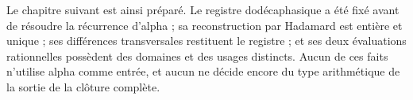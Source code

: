 Le chapitre suivant est ainsi préparé. Le registre dodécaphasique a été fixé avant
de résoudre la récurrence d'alpha ; sa reconstruction par Hadamard est
entière et unique ; ses différences transversales restituent le registre ; et
ses deux évaluations rationnelles possèdent des domaines et des usages distincts. Aucun
de ces faits n'utilise alpha comme entrée, et aucun ne décide encore du
type arithmétique de la sortie de la clôture complète.
